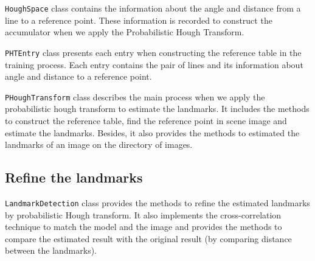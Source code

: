 \texttt{HoughSpace} class contains the information about the angle and distance from a line to a reference point. These information is recorded to construct the accumulator when we apply the Probabilistic Hough Transform.

\texttt{PHTEntry} class presents each entry when constructing the reference table in the training process. Each entry contains the pair of lines and its information about angle and distance to a reference point.

\texttt{PHoughTransform} class describes the main process when we apply the probabilistic hough transform to estimate the landmarks. It includes the methods to construct the reference table, find the reference point in scene image and estimate the landmarks. Besides, it also provides the methods to estimated the landmarks of an image on the directory of images.
\subsection{Refine the landmarks}
\texttt{LandmarkDetection} class provides the methods to refine the estimated landmarks by probabilistic Hough transform. It also implements the cross-correlation technique to match the model and the image and provides the methods to compare the estimated result with the original result (by comparing distance between the landmarks).